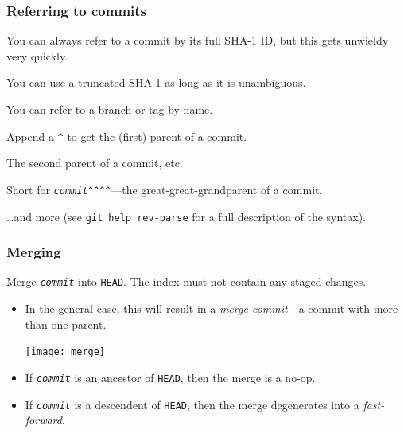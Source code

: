 \documentclass{beamer}
\begin{document}
\begin{frame}
  \frametitle{Referring to commits}

  \begin{description}
  \item[\texttt{fc8da7a06bb66b707e7f5406657d5a3b7ee42c66}] You
    can always refer to a commit by its full SHA-1 ID, but this gets
    unwieldy very quickly.
  \item[\texttt{fc8da7}] You can use a truncated SHA-1 as long as it
    is unambiguous.
  \item[\texttt{\textit{refname}}] You can refer to a branch or tag by
    name.
  \item[\texttt{\textit{commit}\^{}}] Append a \texttt{\^{}} to get
    the (first) parent of a commit.
  \item[\texttt{\textit{commit}\^{}2}] The second parent of a commit,
    etc.
  \item[\texttt{\textit{commit}\~{}4}] Short for
    \texttt{\textit{commit}\^{}\^{}\^{}\^{}}---the
    great-great-grandparent of a commit.
  \end{description}
  \dots and more (see \texttt{git help rev-parse} for a full
  description of the syntax).
\end{frame}

\begin{frame}
  \frametitle{Merging}
  \begin{description}
  \item[\texttt{git merge \textit{commit}}] Merge
    \texttt{\textit{commit}} into \texttt{HEAD}. The index must not
    contain any staged changes.
  \end{description}

  \begin{itemize}
  \item In the general case, this will result in a \emph{merge
      commit}---a commit with more than one parent.
    \begin{center}
      \texttt{[image: merge]}
    \end{center}
  \item If \texttt{\textit{commit}} is an ancestor of \texttt{HEAD},
    then the merge is a no-op.
  \item If \texttt{\textit{commit}} is a descendent of \texttt{HEAD},
    then the merge degenerates into a \emph{fast-forward}.
  \end{itemize}
\end{frame}
\end{document}
